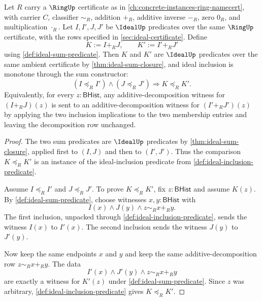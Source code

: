 \begin{theorem}
\label{thm:ideal-sum-inclusion-monotone}
Let $R$ carry a $\RingUp$ certificate as in \autoref{ch:concrete-instances-ring-namecert}, with carrier $C$, classifier $\sim_R$, addition $+_R$, additive inverse $-_R$, zero $0_R$, and multiplication $\cdot_R$. Let $I,I',J,J'$ be $\IdealUp$ predicates over the same $\RingUp$ certificate, with the rows specified in \autoref{sec:ideal-certificate}. Define
$$
K:=I+_RJ,
\qquad
K':=I'+_RJ'
$$
using \autoref{def:ideal-sum-predicate}. Then $K$ and $K'$ are $\IdealUp$ predicates over the same ambient certificate by \autoref{thm:ideal-sum-closure}, and ideal inclusion is monotone through the sum constructor:
$$
(I\preceq_R I')\land(J\preceq_R J')
\Longrightarrow
K\preceq_R K'.
$$
Equivalently, for every $z:\mathsf{BHist}$, any additive-decomposition witness for $(I+_RJ)(z)$ is sent to an additive-decomposition witness for $(I'+_RJ')(z)$ by applying the two inclusion implications to the two membership entries and leaving the decomposition row unchanged.
\end{theorem}
\begin{proof}
The two sum predicates are $\IdealUp$ predicates by \autoref{thm:ideal-sum-closure}, applied first to $(I,J)$ and then to $(I',J')$. Thus the comparison $K\preceq_RK'$ is an instance of the ideal-inclusion predicate from \autoref{def:ideal-inclusion-predicate}.

Assume $I\preceq_R I'$ and $J\preceq_R J'$. To prove $K\preceq_R K'$, fix $z:\mathsf{BHist}$ and assume $K(z)$. By \autoref{def:ideal-sum-predicate}, choose witnesses $x,y:\mathsf{BHist}$ with
$$
I(x)\land J(y)\land z\sim_R x+_R y.
$$
The first inclusion, unpacked through \autoref{def:ideal-inclusion-predicate}, sends the witness $I(x)$ to $I'(x)$. The second inclusion sends the witness $J(y)$ to $J'(y)$.

Now keep the same endpoints $x$ and $y$ and keep the same additive-decomposition row $z\sim_R x+_R y$. The data
$$
I'(x)\land J'(y)\land z\sim_R x+_R y
$$
are exactly a witness for $K'(z)$ under \autoref{def:ideal-sum-predicate}. Since $z$ was arbitrary, \autoref{def:ideal-inclusion-predicate} gives $K\preceq_RK'$.
\end{proof}

